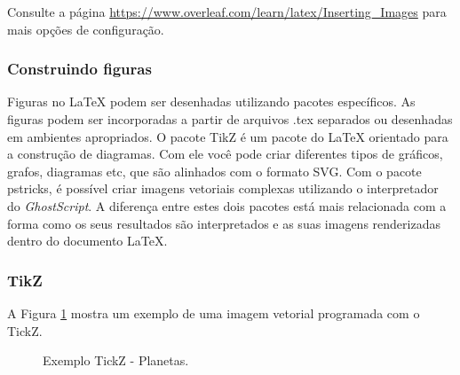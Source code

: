 \begin{marker}
  Consulte a página \url{https://www.overleaf.com/learn/latex/Inserting_Images} para mais opções de configuração.
\end{marker}

\subsubsection*{Construindo figuras}
\label{sec:const_figs}


Figuras no \LaTeX{} podem ser desenhadas utilizando pacotes específicos. As figuras podem ser incorporadas a partir de arquivos .tex separados ou desenhadas em ambientes apropriados. O pacote TikZ é um pacote do \LaTeX{} orientado para a construção de diagramas. Com ele você pode criar diferentes tipos de gráficos, grafos, diagramas etc, que são alinhados com o formato SVG. Com o pacote pstricks, é possível criar imagens vetoriais complexas utilizando o interpretador do \textit{GhostScript}. A diferença entre estes dois pacotes está mais relacionada com a forma como os seus resultados são interpretados e as suas imagens renderizadas dentro do documento \LaTeX{}. %

\subsubsection*{TikZ}

A Figura \ref{fig:exe_tickz} mostra um exemplo de uma imagem vetorial programada com o TickZ.

\begin{figure}[H]
\label{fig:exe_tickz}
    \begin{center}
        \resizebox{0.9\textwidth}{!}{}
    \end{center}
\caption{Exemplo TickZ - Planetas.}
\end{figure}


